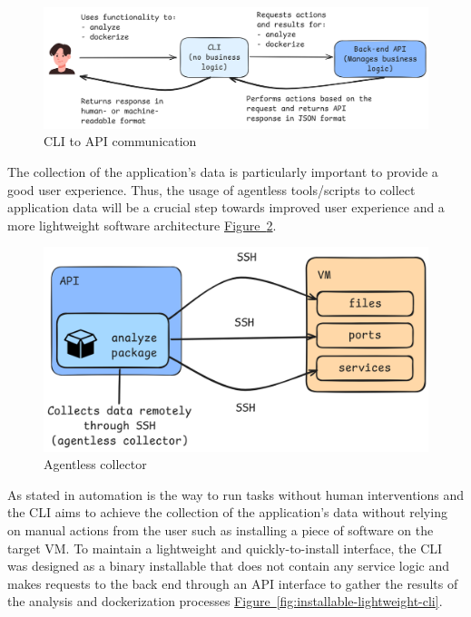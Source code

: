\documentclass[twocolumn]{article}
\newcommand{\FigRef}[1]{\hyperref[#1]{Figure~\ref{#1}}}
\begin{document}
\begin{figure}[H]
    \centering
    \includegraphics[width=\linewidth]{images/cli-api-communication.png}
    \caption{CLI to API communication}
    \label{fig:cli-api-communication}
\end{figure}

The collection of the application’s data is particularly important to provide a good user experience. Thus, the usage of agentless tools/scripts to collect application data will be a crucial step towards improved user experience and a more lightweight software architecture \FigRef{fig:agentless-collector}.

\begin{figure}[H]
    \centering
    \includegraphics[width=\linewidth]{images/agentless-collector.png}
    \caption{Agentless collector}
    \label{fig:agentless-collector}
\end{figure}

As stated in \cite{Elradi-2023} automation is the way to run tasks without human interventions and the CLI aims to achieve the collection of the application’s data without relying on manual actions from the user such as installing a piece of software on the target VM. To maintain a lightweight and quickly-to-install interface, the CLI was designed as a binary installable that does not contain any service logic and makes requests to the back end through an API interface to gather the results of the analysis and dockerization processes \FigRef{fig:installable-lightweight-cli}. 
\end{document}
